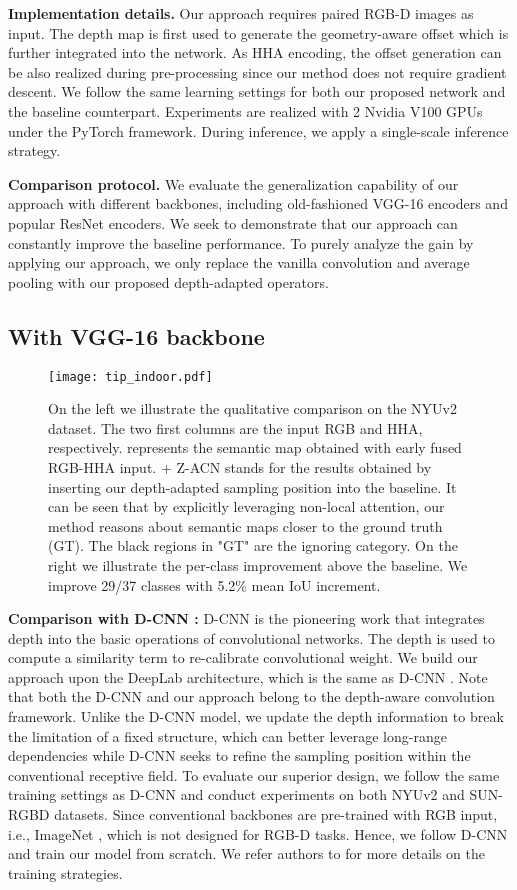 \documentclass[lettersize,journal]{IEEEtran}
\begin{document}
\textbf{Implementation details.} Our approach requires paired RGB-D images as input. The depth map is first used to generate the geometry-aware offset which is further integrated into the network. As HHA encoding, the offset generation can be also realized during pre-processing since our method does not require gradient descent. We follow the same learning settings for both our proposed network and the baseline counterpart. Experiments are realized with 2 Nvidia V100 GPUs under the PyTorch framework. During inference, we apply a single-scale inference strategy.


\textbf{Comparison protocol.} We evaluate the generalization capability of our approach with different backbones, including old-fashioned VGG-16 encoders and popular ResNet encoders. We seek to demonstrate that our approach can constantly improve the baseline performance. To purely analyze the gain by applying our approach, we only replace the vanilla convolution and average pooling with our proposed depth-adapted operators. 


\subsection{With VGG-16 backbone}
\begin{figure*}
\centering
\texttt{[image: tip\_indoor.pdf]}
\caption{On the left we illustrate the qualitative comparison on the NYUv2 dataset. The two first columns are the input RGB and HHA, respectively.  represents the semantic map obtained with early fused RGB-HHA input. + Z-ACN stands for the results obtained by inserting our depth-adapted sampling position into the baseline. It can be seen that by explicitly leveraging non-local attention, our method reasons about semantic maps closer to the ground truth (GT). The black regions in "GT" are the ignoring category. On the right we illustrate the per-class improvement above the baseline. We improve 29/37 classes with 5.2\% mean IoU increment.}
\label{fig:nyu}
\end{figure*}

\textbf{Comparison with D-CNN \cite{Wang2018DCNN}:} D-CNN is the pioneering work that integrates depth into the basic operations of convolutional networks. The depth is used to compute a similarity term to re-calibrate convolutional weight. We build our approach upon the DeepLab architecture, which is the same as D-CNN \cite{Wang2018DCNN}. Note that both the D-CNN and our approach belong to the depth-aware convolution framework. Unlike the D-CNN model, we update the depth information to break the limitation of a fixed structure, which can better leverage long-range dependencies while D-CNN seeks to refine the sampling position within the conventional receptive field. To evaluate our superior design, we follow the same training settings as D-CNN and conduct experiments on both NYUv2 and SUN-RGBD datasets. Since conventional backbones are pre-trained with RGB input, i.e., ImageNet \cite{imagenet}, which is not designed for RGB-D tasks. Hence, we follow D-CNN and train our model from scratch. We refer authors to \cite{Wang2018DCNN} for more details on the training strategies.
\end{document}
